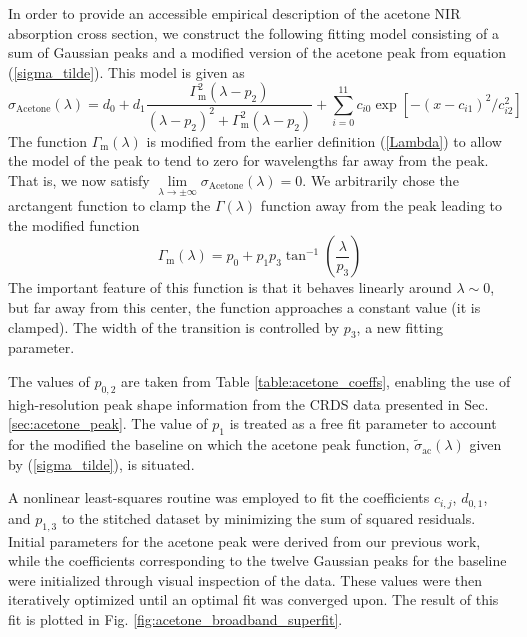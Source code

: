 \documentclass[12pt]{report}
\begin{document}
	In order to provide an accessible empirical description of the acetone NIR absorption cross section, we construct the following fitting model consisting of a sum of Gaussian peaks and a modified version of the acetone peak from equation (\ref{sigma_tilde}). This model is given as
	\begin{equation} \label{acetone_super_model}
		\sigma_\mathrm{Acetone}(\lambda) = d_0 + d_1\frac{\Gamma_\mathrm{m}^2(\lambda-p_2)}{(\lambda-p_2)^2 + \Gamma_\mathrm{m}^2(\lambda-p_2)} + \sum_{i=0}^{11} c_{i0} \exp \left[-(x-c_{i1})^2/c_{i2}^2\right]
	\end{equation}
	The function $\Gamma_\mathrm{m}(\lambda)$ is modified from the earlier definition (\ref{Lambda}) to allow the model of the peak to tend to zero for wavelengths far away from the peak. That is, we now satisfy $\lim\limits_{\lambda\rightarrow\pm\infty}\sigma_\mathrm{Acetone}(\lambda) = 0$.  We arbitrarily chose the arctangent function to clamp the $\Gamma(\lambda)$ function away from the peak leading to the modified function
	\begin{equation}
		\Gamma_\mathrm{m}(\lambda) = p_0 + p_1 p_3 \tan^{-1}\left(\frac{\lambda}{p_3}\right)
	\end{equation}
	The important feature of this function is that it behaves linearly around $\lambda \sim 0$, but far away from this center, the function approaches a constant value (it is clamped). The width of the transition is controlled by $p_3$, a new fitting parameter.
	
	The values of $p_{0,2}$ are taken from Table \ref{table:acetone_coeffs}, enabling the use of high-resolution peak shape information from the CRDS data presented in Sec. \ref{sec:acetone_peak}. The value of $p_1$ is treated as a free fit parameter to account for the modified the baseline on which the acetone peak function, $\tilde{\sigma}_{\mathrm{ac}}(\lambda)$ given by (\ref{sigma_tilde}), is situated.
	
	A nonlinear least-squares routine was employed to fit the coefficients $c_{i,j}$, $d_{0,1}$, and $p_{1,3}$ to the stitched dataset by minimizing the sum of squared residuals. Initial parameters for the acetone peak were derived from our previous work, while the coefficients corresponding to the twelve Gaussian peaks for the baseline were initialized through visual inspection of the data. These values were then iteratively optimized until an optimal fit was converged upon. The result of this fit is plotted in Fig. \ref{fig:acetone_broadband_superfit}.
	
\end{document}
